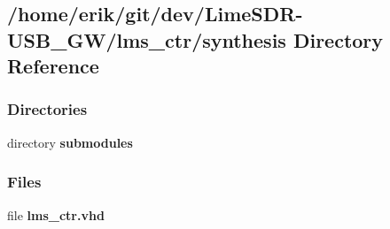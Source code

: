 \subsection{/home/erik/git/dev/\+Lime\+S\+D\+R-\/\+U\+S\+B\+\_\+\+G\+W/lms\+\_\+ctr/synthesis Directory Reference}
\label{dir_efa30d631aa6dbc02b2db9220022a3bd}
\subsubsection*{Directories}
\begin{DoxyCompactItemize}
\item 
directory {\bf submodules}
\end{DoxyCompactItemize}
\subsubsection*{Files}
\begin{DoxyCompactItemize}
\item 
file {\bf lms\+\_\+ctr.\+vhd}
\end{DoxyCompactItemize}
